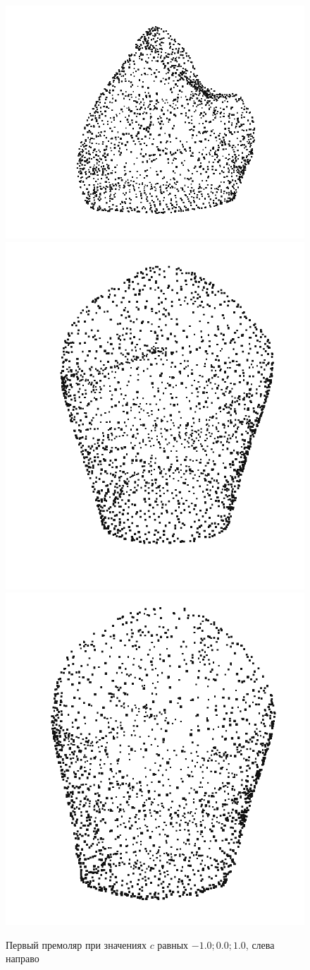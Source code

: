 \begin{figure}[ht!]
    \includegraphics[width=.3\textwidth]{images/snapshot_44_-1_005.png}\hfill
    \includegraphics[width=.3\textwidth]{images/snapshot_44_mean00.png}\hfill
    \includegraphics[width=.3\textwidth]{images/snapshot_44_1_002.png}
    \label{fig:gex3}
    \caption{Первый премоляр при значениях $c$ равных $-1.0; 0.0; 1.0$, слева направо}
\end{figure}


